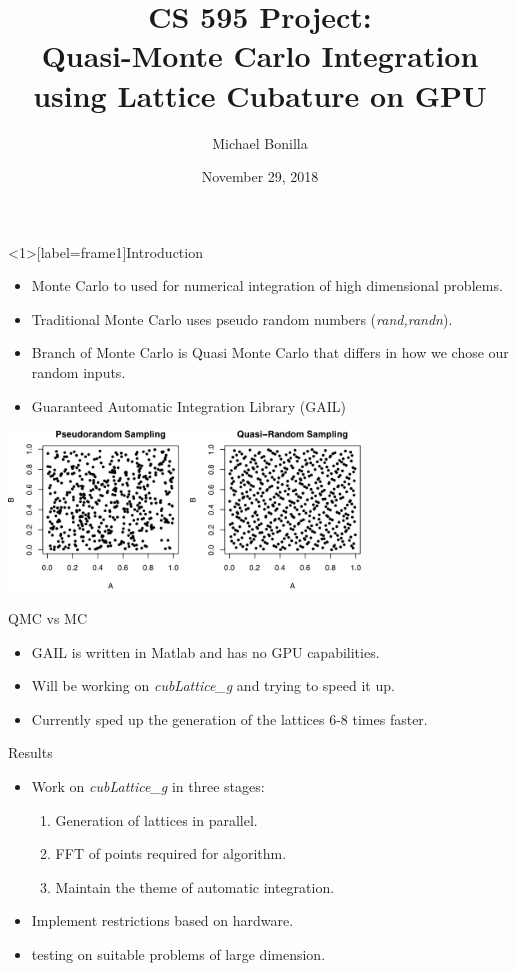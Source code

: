 \documentclass[11pt]{beamer}
\author{Michael Bonilla}
\title{CS 595 Project: \\ Quasi-Monte Carlo Integration using
Lattice Cubature on GPU}
\date{November 29, 2018}
\begin{document}
\nocite{*}
\begin{frame}
\titlepage
\end{frame}


\begin{frame}<1>[label=frame1]{Introduction}
\begin{itemize}
\item Monte Carlo to used for numerical integration of high dimensional problems.
\item Traditional Monte Carlo uses pseudo random numbers (\textit{rand,randn}).
\item Branch of Monte Carlo is Quasi Monte Carlo that differs in how we chose our random inputs.
\item Guaranteed Automatic Integration Library (GAIL)
\end{itemize}
\end{frame}

\begin{frame}
\centering
\includegraphics[width=0.7\textwidth]{pvsq.png} 
\end{frame}

\begin{frame}{QMC vs MC}
\begin{itemize}
\item GAIL is written in Matlab and has no GPU capabilities.
\item Will be working on \textit{cubLattice\_g} and trying to speed it up. 
\item Currently sped up the generation of the lattices 6-8 times faster.
\end{itemize}
\end{frame}

\begin{frame}{Results}
\begin{itemize}
\item Work on \textit{cubLattice\_g} in three stages:
	\begin{enumerate}
		\item Generation of lattices in parallel.
		\item FFT of points required for algorithm.
		\item Maintain the theme of automatic integration.
	\end{enumerate}
\item Implement restrictions based on hardware.
\item testing on suitable problems of large dimension.
\end{itemize}
\end{frame}
\end{document}
